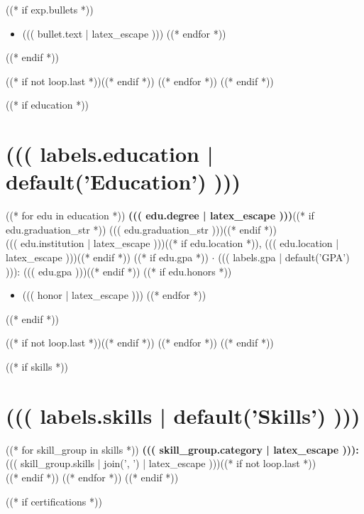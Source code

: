 \documentclass[11pt,letterpaper]{article}
\begin{document}
((* if exp.bullets *))
\begin{itemize}
((* for bullet in exp.bullets *))
    \item ((( bullet.text | latex_escape )))
((* endfor *))
\end{itemize}
((* endif *))

((* if not loop.last *))\vspace{4pt}((* endif *))
((* endfor *))
((* endif *))

((* if education *))
\section{((( labels.education | default('Education') )))}

((* for edu in education *))
\noindent
\textbf{\color{secondary}((( edu.degree | latex_escape )))}((* if edu.graduation_str *)) \hfill {\color{accent}((( edu.graduation_str )))}((* endif *))\\
((( edu.institution | latex_escape )))((* if edu.location *)), ((( edu.location | latex_escape )))((* endif *))%
((* if edu.gpa *)) \enspace $\cdot$ \enspace ((( labels.gpa | default('GPA') ))): ((( edu.gpa )))((* endif *))
((* if edu.honors *))
\begin{itemize}
((* for honor in edu.honors *))
    \item ((( honor | latex_escape )))
((* endfor *))
\end{itemize}
((* endif *))

((* if not loop.last *))\vspace{4pt}((* endif *))
((* endfor *))
((* endif *))

((* if skills *))
\section{((( labels.skills | default('Skills') )))}
((* for skill_group in skills *))
\textbf{((( skill_group.category | latex_escape ))):} ((( skill_group.skills | join(', ') | latex_escape )))((* if not loop.last *))\\[2pt]((* endif *))
((* endfor *))
((* endif *))

((* if certifications *))
\end{document}
